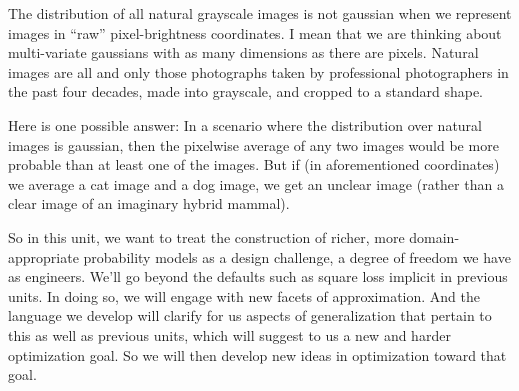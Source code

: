 
The distribution of all natural grayscale images is not gaussian when
we represent images in ``raw'' pixel-brightness coordinates.  I mean
that we are thinking about multi-variate gaussians with as many
dimensions as there are pixels.  Natural images are all and only those
photographs taken by professional photographers in the past four
decades, made into grayscale, and cropped to a standard shape.
%
%
%
\par Here is one possible answer:
In a scenario where the distribution over natural images is gaussian, then the
pixelwise average of any two images would be more probable than at least one of
the images.  But if (in aforementioned coordinates) we average a cat image and
a dog image, we get an unclear image (rather than a clear image of an imaginary
hybrid mammal).


So in this unit, we want to treat the construction of richer, more
domain-appropriate probability models as a design challenge, a degree of
freedom we have as engineers.  We'll go beyond the defaults such as square loss
implicit in previous units.  In doing so, we will engage with new facets of
approximation.  And the language we develop will clarify for us aspects of
generalization that pertain to this as well as previous units, which will
suggest to us a new and harder optimization goal.  So we will then develop new
ideas in optimization toward that goal.

